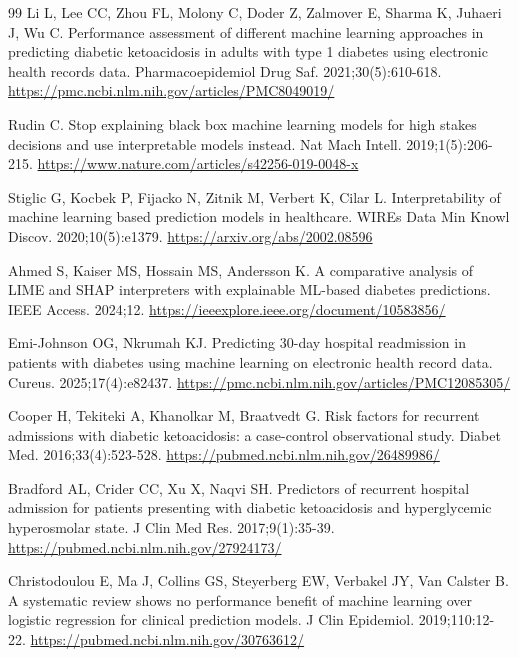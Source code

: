 \documentclass[12pt,a4paper]{article}
\begin{document}
\begin{thebibliography}{99}
 Li L, Lee CC, Zhou FL, Molony C, Doder Z, Zalmover E, Sharma K, Juhaeri J, Wu C.
Performance assessment of different machine learning approaches in predicting diabetic
ketoacidosis in adults with type 1 diabetes using electronic health records data.
Pharmacoepidemiol Drug Saf. 2021;30(5):610-618.
\url{https://pmc.ncbi.nlm.nih.gov/articles/PMC8049019/}

 Rudin C. Stop explaining black box machine learning models for high stakes
decisions and use interpretable models instead. Nat Mach Intell. 2019;1(5):206-215.
\url{https://www.nature.com/articles/s42256-019-0048-x}

 Stiglic G, Kocbek P, Fijacko N, Zitnik M, Verbert K, Cilar L. Interpretability
of machine learning based prediction models in healthcare. WIREs Data Min Knowl Discov.
2020;10(5):e1379. \url{https://arxiv.org/abs/2002.08596}

 Ahmed S, Kaiser MS, Hossain MS, Andersson K. A comparative analysis of LIME and
SHAP interpreters with explainable ML-based diabetes predictions. IEEE Access. 2024;12.
\url{https://ieeexplore.ieee.org/document/10583856/}

 Emi-Johnson OG, Nkrumah KJ. Predicting 30-day hospital readmission in patients
with diabetes using machine learning on electronic health record data. Cureus.
2025;17(4):e82437. \url{https://pmc.ncbi.nlm.nih.gov/articles/PMC12085305/}

 Cooper H, Tekiteki A, Khanolkar M, Braatvedt G. Risk factors for recurrent
admissions with diabetic ketoacidosis: a case-control observational study. Diabet Med.
2016;33(4):523-528. \url{https://pubmed.ncbi.nlm.nih.gov/26489986/}

 Bradford AL, Crider CC, Xu X, Naqvi SH. Predictors of recurrent hospital
admission for patients presenting with diabetic ketoacidosis and hyperglycemic hyperosmolar
state. J Clin Med Res. 2017;9(1):35-39. \url{https://pubmed.ncbi.nlm.nih.gov/27924173/}

 Christodoulou E, Ma J, Collins GS, Steyerberg EW, Verbakel JY, Van Calster B. A
systematic review shows no performance benefit of machine learning over logistic regression for
clinical prediction models. J Clin Epidemiol. 2019;110:12-22.
\url{https://pubmed.ncbi.nlm.nih.gov/30763612/}

\end{thebibliography}
\end{document}
